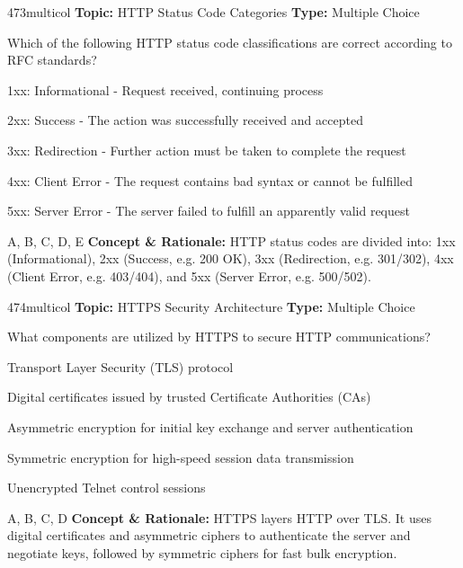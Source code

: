 \begin{qcard}{473}{multicol}
\textcolor{darkslate!75}{\small\textbf{Topic:} HTTP Status Code Categories \hfill \textbf{Type:} Multiple Choice}\vspace{0.4em}\par
Which of the following HTTP status code classifications are correct according to RFC standards?
\begin{qoptions}
\item 1xx: Informational - Request received, continuing process
\item 2xx: Success - The action was successfully received and accepted
\item 3xx: Redirection - Further action must be taken to complete the request
\item 4xx: Client Error - The request contains bad syntax or cannot be fulfilled
\item 5xx: Server Error - The server failed to fulfill an apparently valid request
\end{qoptions}
\end{qcard}
\nopagebreak
\begin{explainbox}{A, B, C, D, E}
\textbf{Concept \& Rationale:} HTTP status codes are divided into: 1xx (Informational), 2xx (Success, e.g. 200 OK), 3xx (Redirection, e.g. 301/302), 4xx (Client Error, e.g. 403/404), and 5xx (Server Error, e.g. 500/502).
\end{explainbox}

\begin{qcard}{474}{multicol}
\textcolor{darkslate!75}{\small\textbf{Topic:} HTTPS Security Architecture \hfill \textbf{Type:} Multiple Choice}\vspace{0.4em}\par
What components are utilized by HTTPS to secure HTTP communications?
\begin{qoptions}
\item Transport Layer Security (TLS) protocol
\item Digital certificates issued by trusted Certificate Authorities (CAs)
\item Asymmetric encryption for initial key exchange and server authentication
\item Symmetric encryption for high-speed session data transmission
\item Unencrypted Telnet control sessions
\end{qoptions}
\end{qcard}
\nopagebreak
\begin{explainbox}{A, B, C, D}
\textbf{Concept \& Rationale:} HTTPS layers HTTP over TLS. It uses digital certificates and asymmetric ciphers to authenticate the server and negotiate keys, followed by symmetric ciphers for fast bulk encryption.
\end{explainbox}

